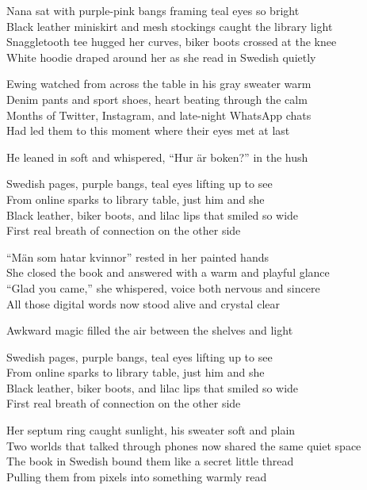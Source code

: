 \begin{lyrics}
Nana sat with purple-pink bangs framing teal eyes so bright\\  
Black leather miniskirt and mesh stockings caught the library light\\  
Snaggletooth tee hugged her curves, biker boots crossed at the knee\\  
White hoodie draped around her as she read in Swedish quietly  

Ewing watched from across the table in his gray sweater warm\\  
Denim pants and sport shoes, heart beating through the calm\\  
Months of Twitter, Instagram, and late-night WhatsApp chats\\  
Had led them to this moment where their eyes met at last  

He leaned in soft and whispered, “Hur är boken?” in the hush  

Swedish pages, purple bangs, teal eyes lifting up to see\\  
From online sparks to library table, just him and she\\  
Black leather, biker boots, and lilac lips that smiled so wide\\  
First real breath of connection on the other side  

“Män som hatar kvinnor” rested in her painted hands\\  
She closed the book and answered with a warm and playful glance\\  
“Glad you came,” she whispered, voice both nervous and sincere\\  
All those digital words now stood alive and crystal clear  

Awkward magic filled the air between the shelves and light  

Swedish pages, purple bangs, teal eyes lifting up to see\\  
From online sparks to library table, just him and she\\  
Black leather, biker boots, and lilac lips that smiled so wide\\  
First real breath of connection on the other side  

Her septum ring caught sunlight, his sweater soft and plain\\  
Two worlds that talked through phones now shared the same quiet space\\  
The book in Swedish bound them like a secret little thread\\  
Pulling them from pixels into something warmly read  


\end{lyrics}
